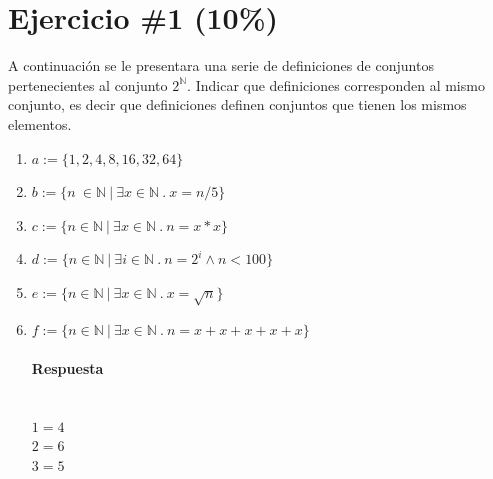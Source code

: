 \documentclass{article}
\begin{document}
\section*{Ejercicio \#1 (10\%)}
A continuaci\'on se le presentara una serie de definiciones de conjuntos pertenecientes al
conjunto $2^{\mathbb{N}}$. Indicar que definiciones corresponden al mismo conjunto, es decir
que definiciones definen conjuntos que tienen los mismos elementos.
\begin{enumerate}
        \item{$a:=\{1,2,4,8,16,32,64\}$}
        \item{$b:=\{n\ \in \mathbb{N}\ |\ \exists x \in \mathbb{N}\ .\ x=n/5 \}$}
        \item{$c:=\{n\in \mathbb{N}\ |\ \exists x\in\mathbb{N}\ .\ n=x*x \}$}
        \item{$d:=\{n\in\mathbb{N}\ |\ \exists i\in\mathbb{N}\ .\ n=2^i\wedge n<100 \}$}
        \item{$e:=\{ n\in\mathbb{N}\ |\ \exists x\in \mathbb{N}\ .\ x=\sqrt{n} \}$}
        \item{$f:=\{ n\in\mathbb{N}\ |\ \exists x\in \mathbb{N}\ .\ n=x+x+x+x+x \}$}
        \paragraph{Respuesta}
        \ \\ $1=4$
        \ \\ $2=6$
        \ \\ $3=5$
\end{enumerate}
\end{document}
